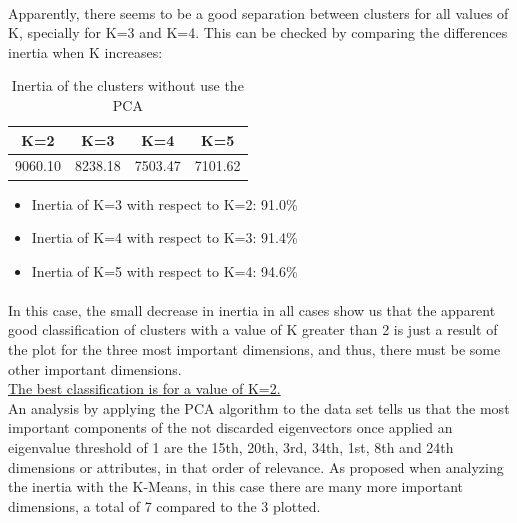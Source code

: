 \documentclass[12pt, a4paper]{article}
\begin{document}
\paragraph{}Apparently, there seems to be a good separation between clusters for all values of K, specially for K=3 and K=4. This can be checked by comparing the differences inertia when K increases:
\begin{table}[ht!]
	\centering
	\begin{tabular}{|c|c|c|c|}
		\hline
		\rowcolor[gray]{0.85} \textbf{K=2}&\textbf{K=3}&\textbf{K=4}&\textbf{K=5}\\\hline
		9060.10&8238.18&7503.47&7101.62\\\hline
	\end{tabular}
	\caption{Inertia of the clusters without use the PCA}
\end{table}
\begin{itemize}
	\item Inertia of K=3 with respect to K=2: 91.0\%
	\item Inertia of K=4 with respect to K=3: 91.4\%
	\item Inertia of K=5 with respect to K=4: 94.6\%
\end{itemize}
\paragraph{}In this case, the small decrease in inertia in all cases show us that the apparent good classification of clusters with a value of K greater than 2 is just a result of the plot for the three most important dimensions, and thus, there must be some other important dimensions.\\

\underline{The best classification is for a value of K=2.}\\

An analysis by applying the PCA algorithm to the data set tells us that the most important components of the not discarded eigenvectors once applied an eigenvalue threshold of 1 are the 15th, 20th, 3rd, 34th, 1st, 8th and 24th dimensions or attributes, in that order of relevance. As proposed when analyzing the inertia with the K-Means, in this case there are many more important dimensions, a total of 7 compared to the 3 plotted.\\
\end{document}

